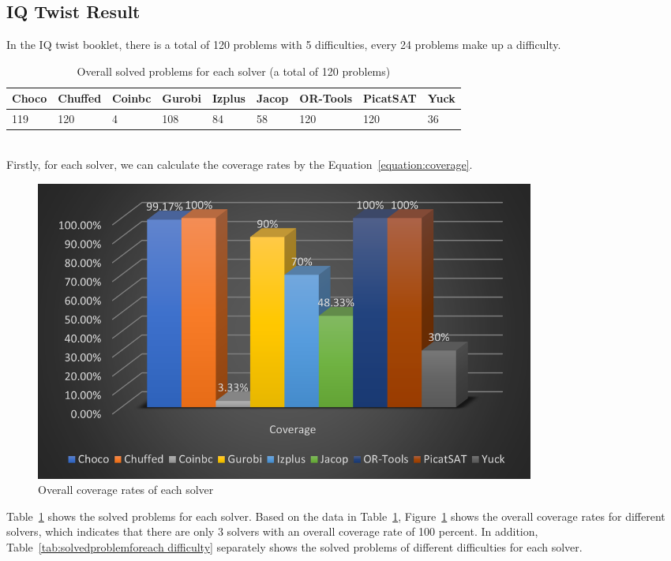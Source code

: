 \subsection{IQ Twist Result}
\label{sec:IQtwistresults}
In the IQ twist booklet, there is a total of 120 problems with 5 difficulties, every 24 problems make up a difficulty. 
\begin{table}[htbp]
\centering
\caption{Overall solved problems for each solver (a total of 120 problems)}
\label{tab:solvedproblem}
\begin{tabular}{|l|l|l|l|l|l|l|l|l|}
\hline
Choco & Chuffed & Coinbc& Gurobi & Izplus&Jacop& OR-Tools& PicatSAT&Yuck \\
\hline
119   &120      & 4     & 108    &84     &58   &120    &120      &36\\
\hline
\end{tabular}
\end{table}
\\Firstly, for each solver, we can calculate the coverage rates by the Equation~\ref{equation:coverage}.
\begin{figure}[H]
     \centering
    \includegraphics[width=0.8\textwidth]{figs/coverage.png}
    \caption{Overall coverage rates of each solver}
    \label{eva2}
\end{figure}
Table~\ref{tab:solvedproblem} shows the solved problems for each solver. Based on the data in Table~\ref{tab:solvedproblem},
Figure~\ref{eva2} shows the overall coverage rates for different solvers, which indicates that there are only 3 solvers with an overall coverage rate of 100 percent.
In addition, Table~\ref{tab:solvedproblemforeach difficulty} separately shows the solved problems of different difficulties for each solver. 
